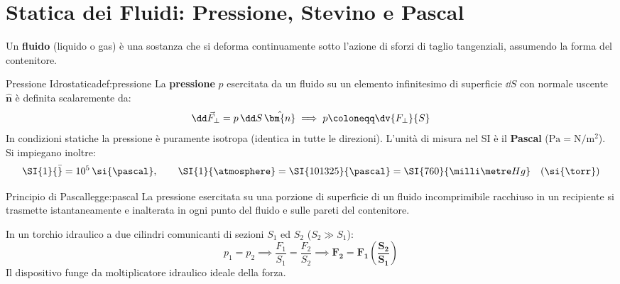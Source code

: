 \section{Statica dei Fluidi: Pressione, Stevino e Pascal}
\label{sec:statica_fluidi}

Un \textbf{fluido} (liquido o gas) è una sostanza che si deforma continuamente sotto l'azione di sforzi di taglio tangenziali, assumendo la forma del contenitore.

\begin{definizione}{Pressione Idrostatica}{def:pressione}
La \textbf{pressione} $p$ esercitata da un fluido su un elemento infinitesimo di superficie $\dd S$ con normale uscente $\hat{\bm{n}}$ è definita scalaremente da:
\begin{equation}
    \dd\vec{F}_\perp = p\,\dd S\,\hat{\bm{n}} \implies p \coloneqq \dv{F_\perp}{S}
    \label{eq:pressione_def}
\end{equation}
In condizioni statiche la pressione è puramente isotropa (identica in tutte le direzioni). L'unità di misura nel SI è il \textbf{Pascal} ($\si{\pascal} = \si{\newton\per\metre\squared}$). Si impiegano inoltre:
\begin{equation}
    \SI{1}{\bar} = 10^5\,\si{\pascal}, \qquad \SI{1}{\atmosphere} = \SI{101325}{\pascal} = \SI{760}{\milli\metre Hg} \quad (\si{\torr})
\end{equation}
\end{definizione}

\begin{legge}{Principio di Pascal}{legge:pascal}
La pressione esercitata su una porzione di superficie di un fluido incomprimibile racchiuso in un recipiente si trasmette istantaneamente e inalterata in ogni punto del fluido e sulle pareti del contenitore.
\end{legge}

\begin{esempio}
In un torchio idraulico a due cilindri comunicanti di sezioni $S_1$ ed $S_2$ ($S_2 \gg S_1$):
\begin{equation}
    p_1 = p_2 \implies \frac{F_1}{S_1} = \frac{F_2}{S_2} \implies \mathbf{F_2 = F_1\left(\frac{S_2}{S_1}\right)}
\end{equation}
Il dispositivo funge da moltiplicatore idraulico ideale della forza.
\end{esempio}

